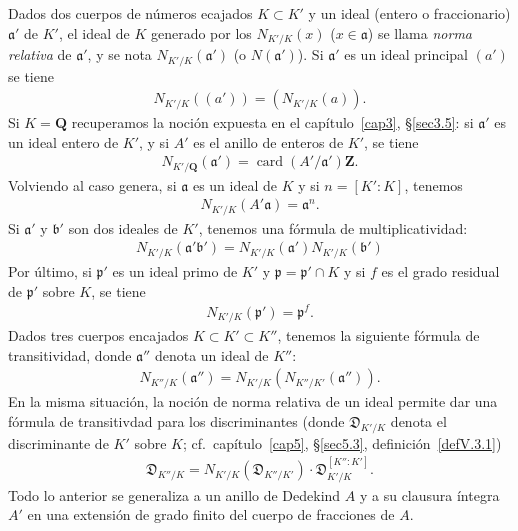 \documentclass[10pt,oneside,bibtotoc,smallheadings,leqno,a5paper,DIV=12]{scrbook}
\newcommand{\QQ}{\mathbf{Q}}
\newcommand{\ZZ}{\mathbf{Z}}
\newcommand{\idl}[1]{\mathfrak{#1}}
\newcommand{\disc}{\mathfrak{D}}
\DeclareMathOperator{\card}{card}
\numberwithin{equation}{section}
\theoremstyle{defi}
\theoremstyle{enonce}
\theoremstyle{rem}
\numberwithin{theorem}{section}
\numberwithin{proposition}{section}
\numberwithin{definition}{section}
\numberwithin{lemma}{section}
\numberwithin{corollary}{section}
\numberwithin{example}{section}
\numberwithin{footnote}{section}%
\begin{document}
Dados dos cuerpos de n\'umeros ecajados $K\subset K'$ y un ideal (entero o fraccionario) $\idl{a}'$ de $K'$,
el ideal de $K$ generado por los $N_{K'/K}(x)$ ($x\in\idl{a}$) se llama {\em norma relativa} de $\idl{a}'$,
y se nota $N_{K'/K}(\idl{a}')$ (o $N(\idl{a}')$). Si $\idl{a}'$ es un ideal principal $(a')$ se tiene
\begin{gather}
N_{K'/K}((a')) = (N_{K'/K}(a)).
\end{gather}
Si $K=\QQ$ recuperamos la noci\'on expuesta en el cap\'itulo~\ref{cap3}, \S\ref{sec3.5}: si $\idl{a}'$ es un
ideal entero de $K'$, y si $A'$ es el anillo de enteros de $K'$, se tiene
\begin{gather}
N_{K'/\QQ}(\idl{a}') = \card(A'/\idl{a}')\ZZ.
\end{gather}
Volviendo al caso genera, si $\idl{a}$ es un ideal de $K$ y si $n=[K':K]$, tenemos
\begin{gather}
N_{K'/K}(A'\idl{a}) = \idl{a}^{n}.
\end{gather}
Si $\idl{a}'$ y $\idl{b}'$ son dos ideales de $K'$, tenemos una f\'ormula de multiplicatividad:
\begin{gather}
N_{K'/K}(\idl{a}'\idl{b}') = N_{K'/K}(\idl{a}')N_{K'/K}(\idl{b}')
\end{gather}
Por \'ultimo, si $\idl{p}'$ es un ideal primo de $K'$ y $\idl{p} = \idl{p}'\cap K$ y si $f$ es el grado
residual de $\idl{p}'$ sobre $K$, se tiene
\begin{gather}
N_{K'/K}(\idl{p}') = \idl{p}^{f}.
\end{gather}
Dados tres cuerpos encajados $K\subset K'\subset K''$, tenemos la siguiente f\'ormula de transitividad, donde
$\idl{a}''$ denota un ideal de $K''$:
\begin{gather}
N_{K''/K}(\idl{a}'') = N_{K'/K}(N_{K''/K'}(\idl{a}'')).
\end{gather}
En la misma situaci\'on, la noci\'on de norma relativa de un ideal permite dar una f\'ormula de transitivdad
para los discriminantes (donde $\disc_{K'/K}$ denota el discriminante de $K'$ sobre $K$;
cf.~cap\'itulo~\ref{cap5}, \S\ref{sec5.3}, definici\'on~\ref{defV.3.1})
\begin{gather}
\disc_{K''/K}=N_{K'/K}(\disc_{K''/K'})\cdot\disc_{K'/K}^{[K'':K']}.
\end{gather}
Todo lo anterior se generaliza a un anillo de Dedekind $A$ y a su clausura \'integra $A'$ en una extensi\'on
de grado finito del cuerpo de fracciones de $A$.

\end{document}
